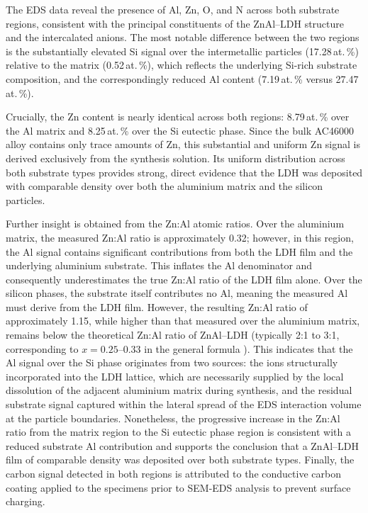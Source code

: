 \documentclass[11pt,twoside,a4paper,final]{report}
\begin{document}
The EDS data reveal the presence of Al, Zn, O, and N across both substrate regions, consistent with the principal constituents of the ZnAl--LDH structure and the intercalated  anions. The most notable difference between the two regions is the substantially elevated Si signal over the intermetallic particles (17.28\,at.\,\%) relative to the matrix (0.52\,at.\,\%), which reflects the underlying Si-rich substrate composition, and the correspondingly reduced Al content (7.19\,at.\,\% versus 27.47\,at.\,\%).

Crucially, the Zn content is nearly identical across both regions: 8.79\,at.\,\% over the Al matrix and 8.25\,at.\,\% over the Si eutectic phase. Since the bulk AC46000 alloy contains only trace amounts of Zn, this substantial and uniform Zn signal is derived exclusively from the synthesis solution. Its uniform distribution across both substrate types provides strong, direct evidence that the LDH was deposited with comparable density over both the aluminium matrix and the silicon particles.

Further insight is obtained from the Zn:Al atomic ratios. Over the aluminium matrix, the measured Zn:Al ratio is approximately 0.32; however, in this region, the Al signal contains significant contributions from both the LDH film and the underlying aluminium substrate. This inflates the Al denominator and consequently underestimates the true Zn:Al ratio of the LDH film alone. Over the silicon phases, the substrate itself contributes no Al, meaning the measured Al must derive from the LDH film. However, the resulting Zn:Al ratio of approximately 1.15, while higher than that measured over the aluminium matrix, remains below the theoretical Zn:Al ratio of ZnAl--LDH (typically 2:1 to 3:1, corresponding to $x = 0.25$--$0.33$ in the general formula \cite{Zhou2017}). This indicates that the Al signal over the Si phase originates from two sources: the  ions structurally incorporated into the LDH lattice, which are necessarily supplied by the local dissolution of the adjacent aluminium matrix during synthesis, and the residual substrate signal captured within the lateral spread of the EDS interaction volume at the particle boundaries. Nonetheless, the progressive increase in the Zn:Al ratio from the matrix region to the Si eutectic phase region is consistent with a reduced substrate Al contribution and supports the conclusion that a ZnAl--LDH film of comparable density was deposited over both substrate types. Finally, the carbon signal detected in both regions is attributed to the conductive carbon coating applied to the specimens prior to SEM-EDS analysis to prevent surface charging.
\end{document}
